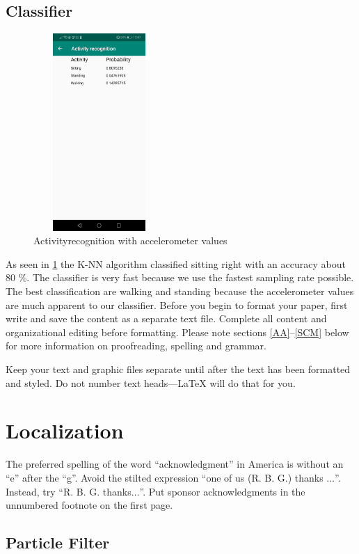 \documentclass[conference]{IEEEtran}
\begin{document}
\subsection{Classifier}
\begin{figure}
\includegraphics[height = 7.5cm,width = 5cm]{Images/AcitivityRecognition.jpeg}
\centering
\caption{Activityrecognition with accelerometer values }
\label{fig:classifier}
\end{figure}
As seen in \ref{fig:classifier} the K-NN algorithm classified sitting right with an accuracy about 80 \%. The classifier is very fast because we use the fastest sampling rate possible. The best classification are walking and standing because the accelerometer values are much apparent to our classifier.
Before you begin to format your paper, first write and save the content as a 
separate text file. Complete all content and organizational editing before 
formatting. Please note sections \ref{AA}--\ref{SCM} below for more information on 
proofreading, spelling and grammar.

Keep your text and graphic files separate until after the text has been 
formatted and styled. Do not number text heads---{\LaTeX} will do that 
for you.


\section*{Localization}

The preferred spelling of the word ``acknowledgment'' in America is without 
an ``e'' after the ``g''. Avoid the stilted expression ``one of us (R. B. 
G.) thanks $\ldots$''. Instead, try ``R. B. G. thanks$\ldots$''. Put sponsor 
acknowledgments in the unnumbered footnote on the first page.

\subsection*{Particle Filter}
\end{document}
